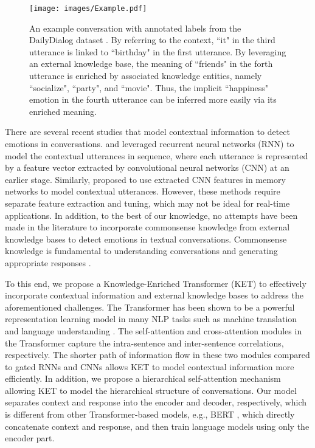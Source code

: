 \documentclass[11pt,a4paper]{article}
\begin{document}
\begin{figure}[!t]
\centering
\texttt{[image: images/Example.pdf]}
\caption{An example conversation with annotated labels from the DailyDialog dataset \cite{li2017dailydialog}. By referring to the context, ``it" in the third utterance is linked to ``birthday" in the first utterance. By leveraging an external knowledge base, the meaning of ``friends" in the forth utterance is enriched by associated knowledge entities, namely ``socialize", ``party", and ``movie". Thus, the implicit ``happiness" emotion in the fourth utterance can be inferred more easily via its enriched meaning.}
\label{fig: example}
\end{figure}

There are several recent studies that model contextual information to detect emotions in conversations. \citet{poria2017context} and \citet{majumder2018dialoguernn} leveraged recurrent neural networks (RNN) to model the contextual utterances in sequence, where each utterance is represented by a feature vector extracted by convolutional neural networks (CNN) at an earlier stage. Similarly, \citet{hazarika2018icon, hazarika2018conversational} proposed to use extracted CNN features in memory networks to model contextual utterances. However, these methods require separate feature extraction and tuning, which may not be ideal for real-time applications. 
In addition, to the best of our knowledge, no attempts have been made in the literature to incorporate commonsense knowledge from external knowledge bases to detect emotions in textual conversations. Commonsense knowledge is fundamental to understanding conversations and generating appropriate responses \cite{zhou2018commonsense}.

To this end, we propose a Knowledge-Enriched Transformer (KET) to effectively incorporate contextual information and external knowledge bases to address the aforementioned challenges. The Transformer \cite{vaswani2017attention} has been shown to be a powerful representation learning model in many NLP tasks such as machine translation \cite{vaswani2017attention} and language understanding \cite{devlin2018bert}. The self-attention \cite{cheng2016long} and cross-attention \cite{bahdanau2014neural} modules in the Transformer capture the intra-sentence and inter-sentence correlations, respectively. The shorter path of information flow in these two modules compared to gated RNNs and CNNs allows KET to model contextual information more efficiently. In addition, we propose a hierarchical self-attention mechanism allowing KET to model the hierarchical structure of conversations. Our model separates context and response into the encoder and decoder, respectively, which is different from other Transformer-based models, e.g., BERT \cite{devlin2018bert}, which directly concatenate context and response, and then train language models using only the encoder part.
\end{document}
